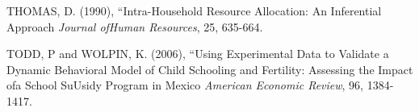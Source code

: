 THOMAS, D. (1990), ``Intra-Household Resource Allocation: An Inferential Approach {\it Journal ofHuman Resources}, 25, 635-664.

TODD, $\mathrm{P}$ and WOLPIN, K. (2006), ``Using Experimental Data to Validate a Dynamic Behavioral Model of Child Schooling and Fertility: Assessing the Impact ofa School SuUsidy Program in Mexico {\it American Economic Review}, 96, 1384-1417.

